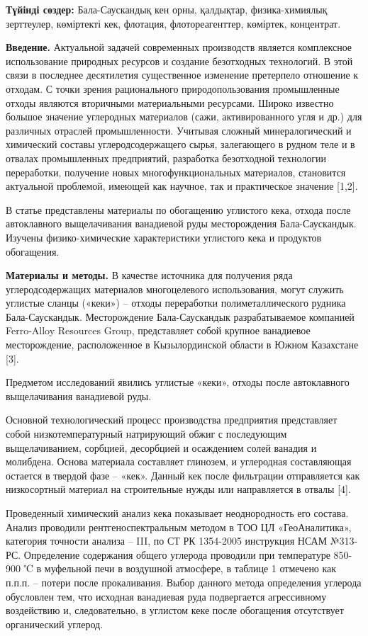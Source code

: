 {\bfseries Түйінді сөздер:} Бала-Саускандық кен орны, қалдықтар,
физика-химиялық зерттеулер, көміртекті кек, флотация, флотореагенттер,
көміртек, концентрат.

{\bfseries Введение.} Актуальной задачей современных производств является
комплексное использование природных ресурсов и создание безотходных
технологий. В этой связи в последнее десятилетия существенное изменение
претерпело отношение к отходам. С точки зрения рационального
природопользования промышленные отходы являются вторичными материальными
ресурсами. Широко известно большое значение углеродных материалов (сажи,
активированного угля и др.) для различных отраслей промышленности.
Учитывая сложный минералогический и химический составы
углеродсодержащего сырья, залегающего в рудном теле и в отвалах
промышленных предприятий, разработка безотходной технологии переработки,
получение новых многофункциональных материалов, становится актуальной
проблемой, имеющей как научное, так и практическое значение {[}1,2{]}.

В статье представлены материалы по обогащению углистого кека, отхода
после автоклавного выщелачивания ванадиевой руды месторождения
Бала-Саускандык. Изучены физико-химические характеристики углистого кека
и продуктов обогащения.

{\bfseries Материалы и методы.} В качестве источника для получения ряда
углеродсодержащих материалов многоцелевого использования, могут служить
углистые сланцы («кеки») -- отходы переработки полиметаллического
рудника Бала-Саускандык. Месторождение Бала-Саускандык разрабатываемое
компанией Ferro-Alloy Resources Group, представляет собой крупное
ванадиевое месторождение, расположенное в Кызылординской области в Южном
Казахстане {[}3{]}.

Предметом исследований явились углистые «кеки», отходы после
автоклавного выщелачивания ванадиевой руды.

Основной технологический процесс производства предприятия представляет
собой низкотемпературный натрирующий обжиг с последующим выщелачиванием,
сорбцией, десорбцией и осаждением солей ванадия и молибдена. Основа
материала составляет глинозем, и углеродная составляющая остается в
твердой фазе -- «кек». Данный кек после фильтрации отправляется как
низкосортный материал на строительные нужды или направляется в отвалы
{[}4{]}.

Проведенный химический анализ кека показывает неоднородность его
состава. Анализ проводили рентгеноспектральным методом в ТОО ЦЛ
«ГеоАналитика», категория точности анализа -- III, по СТ РК 1354-2005
инструкция НСАМ №313-РС. Определение содержания общего углерода
проводили при температуре 850-900 ℃ в муфельной печи в воздушной
атмосфере, в таблице 1 отмечено как п.п.п. -- потери после прокаливания.
Выбор данного метода определения углерода обусловлен тем, что исходная
ванадиевая руда подвергается агрессивному воздействию и, следовательно,
в углистом кеке после обогащения отсутствует органический углерод.

